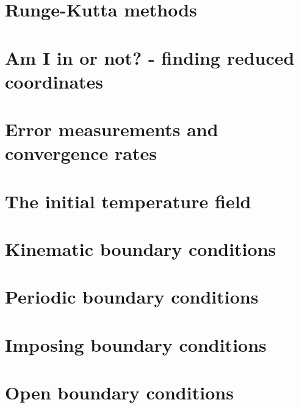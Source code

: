 \section{Runge-Kutta methods}\label{ss:rkm}  %
\newpage %
\section{Am I in or not? - finding reduced coordinates}\label{sec:amiin} %
\newpage %
\section{Error measurements and convergence rates}  %
\newpage %
\section{The initial temperature field}  %
\newpage %
\section{Kinematic boundary conditions}\label{kin_bc}  %
\newpage %
\section{Periodic boundary conditions\label{ss_periodic}} %
\newpage %
\section{Imposing boundary conditions \label{ss:howtobc}}  %
\newpage %
\section{Open boundary conditions}\label{ss:openbc} %
\newpage %
